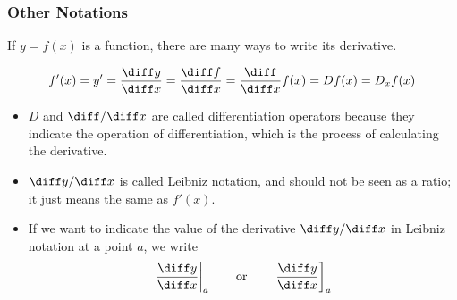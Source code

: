 \begin{frame}
\frametitle{Other Notations}
If $y = f(x)$ is a function, there are many ways to write its derivative.

\[
f'(x) = y' = \frac{\diff y}{\diff x} = \frac{\diff f}{\diff x} = \frac{\diff}{\diff x} f(x) = Df(x) = D_x f(x)
\]
\begin{itemize}
\item  $D$ and $\diff/\diff x$ are called differentiation operators because they indicate the operation of differentiation, which is the process of calculating the derivative.

\item  $\diff y/\diff x$ is called Leibniz notation, and should not be seen as a ratio; it just means the same as $f'(x)$.  

\item  If we want to indicate the value of the derivative $\diff y/\diff x$ in Leibniz notation at a point $a$, we write
\[
\left. \frac{\diff y}{\diff x}\right|_a \qquad \textrm{or}\qquad \left. \frac{\diff y}{\diff x}\right]_a
\]
\end{itemize}
\end{frame}
